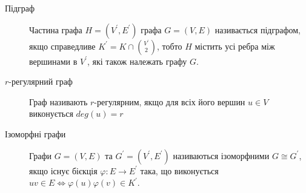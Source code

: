 \begin{description}
        \item[Підграф] Частина графа $H=(V^\prime,E^\prime)$ графа $G=(V,E)$ називається підграфом, якщо справедливе $K^\prime=K\cap {V^\prime \choose 2}$, тобто $H$ містить усі ребра між вершинами в $V^\prime$, які також належать графу $G$.
        \item[$r$-регулярний граф] Граф називають $r$-регулярним, якщо для всіх його вершин $u \in V$ виконується $deg(u)=r$
        \item[Ізоморфні графи] Графи $G = (V,E)$ та $G^\prime = (V^\prime,E^\prime)$ називаються ізоморфними $G \cong G^\prime$, якщо існує бієкція $\varphi : E \to E^\prime$ така, що виконується $uv \in E \Leftrightarrow \varphi (u)\varphi (v) \in K^\prime$.
\end{description}

